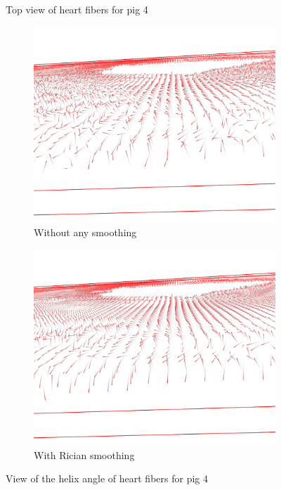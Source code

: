 \begin{figure}[h!]
    \caption{Top view of heart fibers for pig 4}
    \label{fig:pig4_topviews}
    \begin{subfigure}{.48\textwidth}
        \includegraphics[width=\textwidth]{figures/pig4_helix_no_smooth}
        \caption{Without any smoothing}
        \label{fig:pig4_helix_no_smooth}
    \end{subfigure}
    \begin{subfigure}{.48\textwidth}
        \includegraphics[width=\textwidth]{figures/pig4_helix_smooth}
        \caption{With Rician smoothing}
        \label{fig:pig4_helix_smooth}
    \end{subfigure}
    \caption{View of the helix angle of heart fibers for pig 4}
    \label{fig:pig4_helix}
\end{figure}

